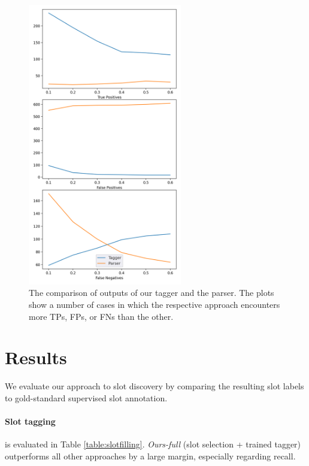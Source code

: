 \begin{figure}
    \centering
    \includegraphics[width=0.6\textwidth]{images/slots.png}
    \caption{The comparison of outputs of our tagger and the parser. The plots show a number of cases in which the respective approach encounters more TPs, FPs, or FNs than the other.}
    \label{fig:tagger_comp}
\end{figure}

\section{Results}
\label{04:sec:discovery_results}
We evaluate our approach to slot discovery by comparing the resulting slot labels to gold-standard supervised slot annotation.

\paragraph{Slot tagging}\hspace{-3mm} is evaluated in Table \ref{table:slotfilling}.
\emph{Ours-full} (slot selection + trained tagger) outperforms all other approaches by a large margin, especially regarding recall.

